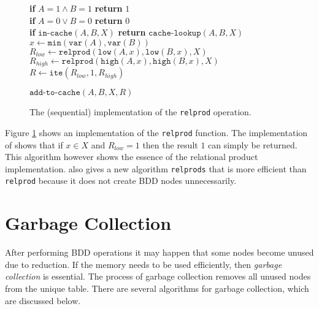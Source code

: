 \begin{figure}
	\centering
	\begin{algorithm}[H]
		\SetStartEndCondition{ }{}{}%
		\AlgoDontDisplayBlockMarkers\SetAlgoNoEnd\SetAlgoNoLine%

		 {
			\textbf{if} $A=1 \wedge B=1$ \textbf{return} $1$ \\
			\textbf{if} $A=0 \vee B=0$ \textbf{return} $0$ \\
			\textbf{if} $\texttt{in-cache}(A, B, X)$ \textbf{return} $\texttt{cache-lookup}(A, B, X)$ \\
			$x \gets \texttt{min}(\texttt{var}(A), \texttt{var}(B))$ \\
			$R_{low} \gets \texttt{relprod}(\texttt{low}(A, x), \texttt{low}(B, x), X)$ \\
			$R_{high} \gets \texttt{relprod}(\texttt{high}(A, x), \texttt{high}(B, x), X)$ \\

			 {
				$R \gets \texttt{ite}(R_{low}, 1, R_{high})$
			}
			
			$\texttt{add-to-cache}(A, B, X, R)$ \\
		}
	\end{algorithm}

	\caption{The (sequential) implementation of the \texttt{relprod} operation.}
	\label{fig:relprod_seq}
\end{figure}

Figure \ref{fig:relprod_seq} shows an implementation of the \texttt{relprod} function. The implementation of \cite{dijk2012parallelization} shows that if $x \in X$ and $R_{low} = 1$ then the result $1$ can simply be returned. This algorithm however shows the essence of the relational product implementation. \cite{dijk2012parallelization} also gives a new algorithm \texttt{relprods} that is more efficient than \texttt{relprod} because it does not create BDD nodes unnecessarily.

\section{Garbage Collection}
After performing BDD operations it may happen that some nodes become unused due to reduction. If the memory needs to be used efficiently, then \emph{garbage collection} is essential. The process of garbage collection removes all unused nodes from the unique table. There are several algorithms for garbage collection, which are discussed below. 

